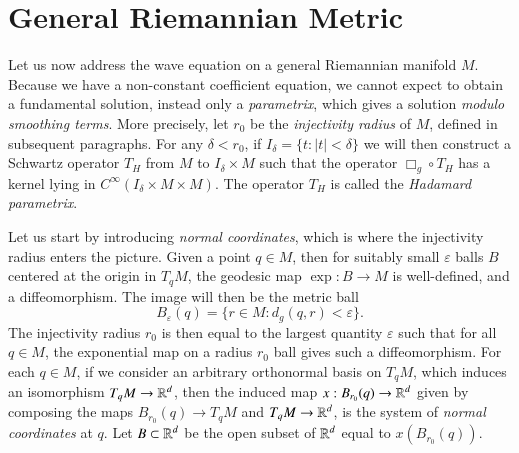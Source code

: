 \section{General Riemannian Metric}

Let us now address the wave equation on a general Riemannian manifold $M$. Because we have a non-constant coefficient equation, we cannot expect to obtain a fundamental solution, instead only a \emph{parametrix}, which gives a solution \emph{modulo smoothing terms}. More precisely, let $r_0$ be the \emph{injectivity radius} of $M$, defined in subsequent paragraphs. For any $\delta < r_0$, if $I_\delta = \{ t : |t| < \delta \}$ we will then construct a Schwartz operator $T_H$ from $M$ to $I_\delta \times M$ such that the operator $\Box_g \circ T_H$ has a kernel lying in $C^\infty(I_\delta \times M \times M)$. The operator $T_H$ is called the \emph{Hadamard parametrix}.

Let us start by introducing \emph{normal coordinates}, which is where the injectivity radius enters the picture. Given a point $q \in M$, then for suitably small $\varepsilon$ balls $B$ centered at the origin in $T_q M$, the geodesic map $\exp: B \to M$ is well-defined, and a diffeomorphism. The image will then be the metric ball
%
\[ B_\varepsilon(q) = \{ r \in M: d_g(q,r) < \varepsilon \}. \]
%
The injectivity radius $r_0$ is then equal to the largest quantity $\varepsilon$ such that for all $q \in M$, the exponential map on a radius $r_0$ ball gives such a diffeomorphism. For each $q \in M$, if we consider an arbitrary orthonormal basis on $T_q M$, which induces an isomorphism $T_q M \to \operatorname{\mathbb{R}}^d$, then the induced map $x: B_{r_0}(q) \to \operatorname{\mathbb{R}}^d$ given by composing the maps $B_{r_0}(q) \to T_q M$ and $T_q M \to \operatorname{\mathbb{R}}^d$, is the system of \emph{normal coordinates} at $q$. Let $B \subset \operatorname{\mathbb{R}}^d$ be the open subset of $\operatorname{\mathbb{R}}^d$ equal to $x(B_{r_0}(q))$.

